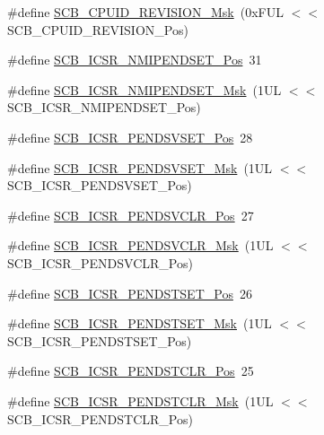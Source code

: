 \begin{DoxyCompactItemize}
\item 
\#define \hyperlink{group___c_m_s_i_s___s_c_b_ga2ec0448b6483f77e7f5d08b4b81d85df}{S\+C\+B\+\_\+\+C\+P\+U\+I\+D\+\_\+\+R\+E\+V\+I\+S\+I\+O\+N\+\_\+\+Msk}~(0x\+F\+U\+L $<$$<$ S\+C\+B\+\_\+\+C\+P\+U\+I\+D\+\_\+\+R\+E\+V\+I\+S\+I\+O\+N\+\_\+\+Pos)
\item 
\#define \hyperlink{group___c_m_s_i_s___s_c_b_ga750d4b52624a46d71356db4ea769573b}{S\+C\+B\+\_\+\+I\+C\+S\+R\+\_\+\+N\+M\+I\+P\+E\+N\+D\+S\+E\+T\+\_\+\+Pos}~31
\item 
\#define \hyperlink{group___c_m_s_i_s___s_c_b_ga340e3f79e9c3607dee9f2c048b6b22e8}{S\+C\+B\+\_\+\+I\+C\+S\+R\+\_\+\+N\+M\+I\+P\+E\+N\+D\+S\+E\+T\+\_\+\+Msk}~(1\+U\+L $<$$<$ S\+C\+B\+\_\+\+I\+C\+S\+R\+\_\+\+N\+M\+I\+P\+E\+N\+D\+S\+E\+T\+\_\+\+Pos)
\item 
\#define \hyperlink{group___c_m_s_i_s___s_c_b_gab5ded23d2ab1d5ff7cc7ce746205e9fe}{S\+C\+B\+\_\+\+I\+C\+S\+R\+\_\+\+P\+E\+N\+D\+S\+V\+S\+E\+T\+\_\+\+Pos}~28
\item 
\#define \hyperlink{group___c_m_s_i_s___s_c_b_ga1e40d93efb402763c8c00ddcc56724ff}{S\+C\+B\+\_\+\+I\+C\+S\+R\+\_\+\+P\+E\+N\+D\+S\+V\+S\+E\+T\+\_\+\+Msk}~(1\+U\+L $<$$<$ S\+C\+B\+\_\+\+I\+C\+S\+R\+\_\+\+P\+E\+N\+D\+S\+V\+S\+E\+T\+\_\+\+Pos)
\item 
\#define \hyperlink{group___c_m_s_i_s___s_c_b_gae218d9022288f89faf57187c4d542ecd}{S\+C\+B\+\_\+\+I\+C\+S\+R\+\_\+\+P\+E\+N\+D\+S\+V\+C\+L\+R\+\_\+\+Pos}~27
\item 
\#define \hyperlink{group___c_m_s_i_s___s_c_b_ga4a901ace381d3c1c74ac82b22fae2e1e}{S\+C\+B\+\_\+\+I\+C\+S\+R\+\_\+\+P\+E\+N\+D\+S\+V\+C\+L\+R\+\_\+\+Msk}~(1\+U\+L $<$$<$ S\+C\+B\+\_\+\+I\+C\+S\+R\+\_\+\+P\+E\+N\+D\+S\+V\+C\+L\+R\+\_\+\+Pos)
\item 
\#define \hyperlink{group___c_m_s_i_s___s_c_b_ga9dbb3358c6167c9c3f85661b90fb2794}{S\+C\+B\+\_\+\+I\+C\+S\+R\+\_\+\+P\+E\+N\+D\+S\+T\+S\+E\+T\+\_\+\+Pos}~26
\item 
\#define \hyperlink{group___c_m_s_i_s___s_c_b_ga7325b61ea0ec323ef2d5c893b112e546}{S\+C\+B\+\_\+\+I\+C\+S\+R\+\_\+\+P\+E\+N\+D\+S\+T\+S\+E\+T\+\_\+\+Msk}~(1\+U\+L $<$$<$ S\+C\+B\+\_\+\+I\+C\+S\+R\+\_\+\+P\+E\+N\+D\+S\+T\+S\+E\+T\+\_\+\+Pos)
\item 
\#define \hyperlink{group___c_m_s_i_s___s_c_b_gadbe25e4b333ece1341beb1a740168fdc}{S\+C\+B\+\_\+\+I\+C\+S\+R\+\_\+\+P\+E\+N\+D\+S\+T\+C\+L\+R\+\_\+\+Pos}~25
\item 
\#define \hyperlink{group___c_m_s_i_s___s_c_b_gab241827d2a793269d8cd99b9b28c2157}{S\+C\+B\+\_\+\+I\+C\+S\+R\+\_\+\+P\+E\+N\+D\+S\+T\+C\+L\+R\+\_\+\+Msk}~(1\+U\+L $<$$<$ S\+C\+B\+\_\+\+I\+C\+S\+R\+\_\+\+P\+E\+N\+D\+S\+T\+C\+L\+R\+\_\+\+Pos)

\end{DoxyCompactItemize}
